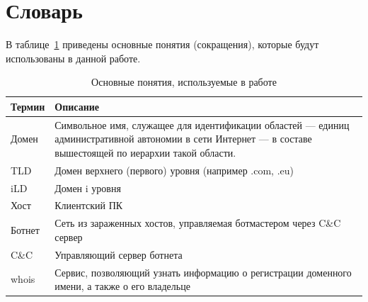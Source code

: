 \documentclass[a4paper,14pt]{extreport} %
\begin{document}
\newpage
\section{Словарь}
В таблице~\ref{tab:dict} приведены основные понятия (сокращения), которые будут использованы в данной работе.
\begin{table}[H]
\centering
\caption{Основные понятия, используемые в работе}\label{tab:dict}
\begin{tabular}{|p{3cm}| p{10cm}|}
	\hline
	Термин & Описание                                                                    \\ \hline
	
	Домен   & Символьное имя, служащее для идентификации областей — единиц административной автономии в сети Интернет — в составе вышестоящей по иерархии такой области. \\ 
	TLD          & Домен верхнего (первого) уровня (например .com, .eu)                                                                                                                                                                                                           \\
	iLD          & Домен i уровня                                                                                                                                                                                                                                                                        \\
	Хост     & Клиентский ПК                                                                                                                                                                                                                                                                        \\
	Ботнет & Сеть из зараженных хостов, управляемая ботмастером через C\&C сервер                                                                                                                                                                      \\
	C\&C         & Управляющий сервер ботнета                                                                                                                                                                                                                                               \\
	whois        & Сервис, позволяющий узнать информацию о регистрации доменного имени, а также о его владельце                                                                                                                       \\

\end{tabular}
\end{table}
\end{document}

